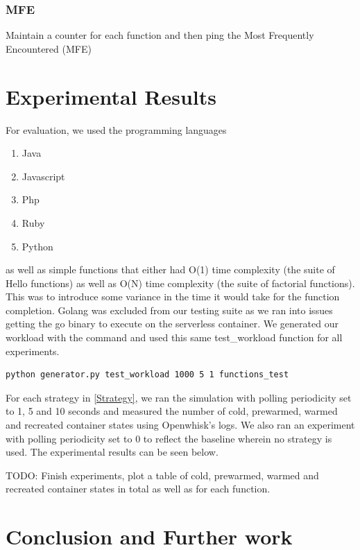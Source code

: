 \documentclass{article}
\begin{document}
\subsubsection{MFE}

Maintain a counter for each function and then ping the Most Frequently Encountered (MFE)

\section{Experimental Results}

For evaluation, we used the programming languages

\begin{enumerate}
    \item Java
    \item Javascript
    \item Php
    \item Ruby
    \item Python
\end{enumerate}

as well as simple functions that either had O(1) time complexity (the suite of Hello functions) as well as O(N) time complexity (the suite of factorial functions). This was to introduce some variance in the time it would take for the function completion. Golang was excluded from our testing suite as we ran into issues getting the go binary to execute on the serverless container. We generated our workload with the command and used this same test\_workload function for all experiments.

\begin{lstlisting}[language=bash,caption={Generating the workload}]
python generator.py test_workload 1000 5 1 functions_test 
\end{lstlisting}

For each strategy in \ref{Strategy}, we ran the simulation with polling periodicity set to 1, 5 and 10 seconds and measured the number of cold, prewarmed, warmed and recreated container states using Openwhisk's logs. We also ran an experiment with polling periodicity set to 0 to reflect the baseline wherein no strategy is used. The experimental results can be seen below.

TODO: Finish experiments, plot a table of cold, prewarmed, warmed and recreated container states in total as well as for each function.

\section{Conclusion and Further work}
\end{document}
